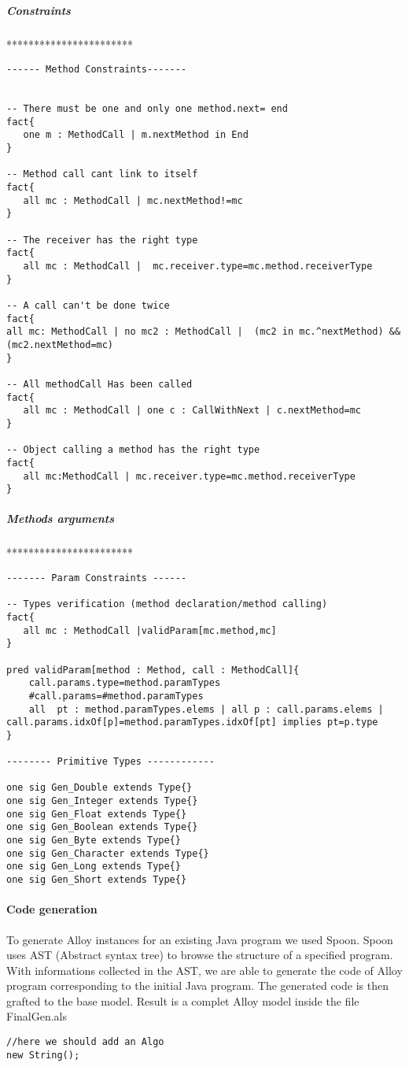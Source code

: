 \subparagraph{Constraints}
***********************
\lstset{language=Alloy}
\begin{lstlisting}
------ Method Constraints-------


-- There must be one and only one method.next= end
fact{
   one m : MethodCall | m.nextMethod in End
}

-- Method call cant link to itself
fact{
   all mc : MethodCall | mc.nextMethod!=mc
}

-- The receiver has the right type
fact{
   all mc : MethodCall |  mc.receiver.type=mc.method.receiverType
}

-- A call can't be done twice
fact{
all mc: MethodCall | no mc2 : MethodCall |  (mc2 in mc.^nextMethod) && (mc2.nextMethod=mc)
}

-- All methodCall Has been called
fact{
   all mc : MethodCall | one c : CallWithNext | c.nextMethod=mc
}

-- Object calling a method has the right type
fact{
   all mc:MethodCall | mc.receiver.type=mc.method.receiverType
}

\end{lstlisting}
\subparagraph{Methods arguments}
***********************
\lstset{language=Alloy}
\begin{lstlisting}
------- Param Constraints ------

-- Types verification (method declaration/method calling)
fact{
   all mc : MethodCall |validParam[mc.method,mc]
}

pred validParam[method : Method, call : MethodCall]{
	call.params.type=method.paramTypes
	#call.params=#method.paramTypes
    all  pt : method.paramTypes.elems | all p : call.params.elems | call.params.idxOf[p]=method.paramTypes.idxOf[pt] implies pt=p.type
}

-------- Primitive Types ------------

one sig Gen_Double extends Type{}
one sig Gen_Integer extends Type{}
one sig Gen_Float extends Type{}
one sig Gen_Boolean extends Type{}
one sig Gen_Byte extends Type{}
one sig Gen_Character extends Type{}
one sig Gen_Long extends Type{}
one sig Gen_Short extends Type{}
\end{lstlisting}
\paragraph{Code generation}
To generate Alloy instances for an existing Java program we used Spoon. Spoon uses AST (Abstract syntax tree)\cite{ast} to browse the structure of a specified program. With informations collected in the AST, we are able to generate the code of Alloy program corresponding to the initial Java program. The generated code is then grafted to the base model.
Result is a complet Alloy model inside the file FinalGen.als
\lstset{language=Java}
\begin{lstlisting}
//here we should add an Algo
new String();
\end{lstlisting}
